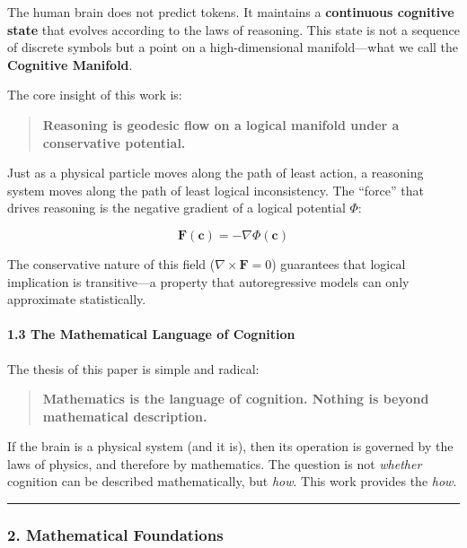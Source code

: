 \documentclass[
  11pt,
  a4paper,
]{article}
\begin{document}
The human brain does not predict tokens. It maintains a
\textbf{continuous cognitive state} that evolves according to the laws
of reasoning. This state is not a sequence of discrete symbols but a
point on a high-dimensional manifold---what we call the
\textbf{Cognitive Manifold}.

The core insight of this work is:

\begin{quote}
\textbf{Reasoning is geodesic flow on a logical manifold under a
conservative potential.}
\end{quote}

Just as a physical particle moves along the path of least action, a
reasoning system moves along the path of least logical inconsistency.
The ``force'' that drives reasoning is the negative gradient of a
logical potential \(\Phi\):

\[\mathbf{F}(\mathbf{c}) = -\nabla \Phi(\mathbf{c})\]

The conservative nature of this field (\(\nabla \times \mathbf{F} = 0\))
guarantees that logical implication is transitive---a property that
autoregressive models can only approximate statistically.

\paragraph{1.3 The Mathematical Language of
Cognition}\label{the-mathematical-language-of-cognition}

The thesis of this paper is simple and radical:

\begin{quote}
\textbf{Mathematics is the language of cognition. Nothing is beyond
mathematical description.}
\end{quote}

If the brain is a physical system (and it is), then its operation is
governed by the laws of physics, and therefore by mathematics. The
question is not \emph{whether} cognition can be described
mathematically, but \emph{how}. This work provides the \emph{how}.

\begin{center}\rule{0.5\linewidth}{0.5pt}\end{center}

\subsubsection{2. Mathematical
Foundations}\label{mathematical-foundations}
\end{document}
